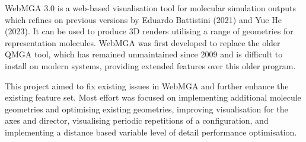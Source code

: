 WebMGA 3.0 is a web-based visualisation tool for molecular simulation outputs which refines on previous versions by Eduardo Battistini (2021) and Yue He (2023). It can be used to produce 3D renders utilising a range of geometries for representation molecules. WebMGA was first developed to replace the older QMGA tool, which  has remained unmaintained since 2009 and is difficult to install on modern systems, providing extended features over this older program.

This project aimed to fix existing issues in WebMGA and further enhance the existing feature set. Most effort was focused on implementing additional molecule geometries and optimising existing geometries, improving visualisation for the axes and director, visualising periodic repetitions of a configuration, and implementing a distance based variable level of detail performance optimisation.
